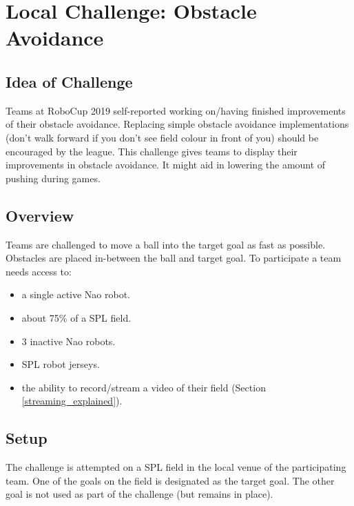 \section{Local Challenge: Obstacle Avoidance}
\label{sec:ObstacleAvoidance}


\subsection{Idea of Challenge}

Teams at RoboCup 2019 self-reported working on/having finished improvements of their obstacle avoidance. Replacing simple obstacle avoidance implementations (don't walk forward if you don't see field colour in front of you) should be encouraged by the league. This challenge gives teams to display their improvements in obstacle avoidance. It might aid in lowering the amount of pushing during games.

\subsection{Overview}

Teams are challenged to move a ball into the target goal as fast as possible. Obstacles are placed in-between the ball and target goal. To participate a team needs access to:

\begin{itemize}
	\item a single active Nao robot.
	\item about 75\% of a SPL field.
	\item 3 inactive Nao robots.
	\item SPL robot jerseys.
	\item the ability to record/stream a video of their field (\cf Section \ref{streaming_explained}).
\end{itemize}


\subsection{Setup}

The challenge is attempted on a SPL field in the local venue of the participating team. One of the goals on the field is designated as the target goal. The other goal is not used as part of the challenge (but remains in place).

